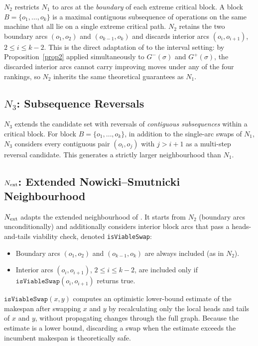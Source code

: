 \documentclass[preprint,12pt]{elsarticle}
\begin{document}
$N_2$ restricts $N_1$ to arcs at the \emph{boundary} of each extreme critical block. A block $B = \{o_1,\ldots,o_k\}$ is a maximal contiguous subsequence of operations on the same machine that all lie on a single extreme critical path. $N_2$ retains the two boundary arcs $(o_1,o_2)$ and $(o_{k-1},o_k)$ and discards interior arcs $(o_i,o_{i+1})$, $2 \leq i \leq k-2$. This is the direct adaptation of \cite{Nowicki1996} to the interval setting: by Proposition~\ref{prop2} applied simultaneously to $G^-(\sigma)$ and $G^+(\sigma)$, the discarded interior arcs cannot carry improving moves under any of the four rankings, so $N_2$ inherits the same theoretical guarantees as $N_1$.

\subsection{$N_3$: Subsequence Reversals}
\label{sec5.3}

$N_3$ extends the candidate set with reversals of \emph{contiguous subsequences} within a critical block. For block $B = \{o_1,\ldots,o_k\}$, in addition to the single-arc swaps of $N_1$, $N_3$ considers every contiguous pair $(o_i, o_j)$ with $j > i+1$ as a multi-step reversal candidate. This generates a strictly larger neighbourhood than $N_1$.

\subsection{$N_{\rm ext}$: Extended Nowicki--Smutnicki Neighbourhood}
\label{sec5.4}

$N_{\rm ext}$ adapts the extended neighbourhood of \cite{Nowicki2005}. It starts from $N_2$ (boundary arcs unconditionally) and additionally considers interior block arcs that pass a heads-and-tails viability check, denoted \texttt{isViableSwap}:
\begin{itemize}
\item Boundary arcs $(o_1,o_2)$ and $(o_{k-1},o_k)$ are always included (as in $N_2$).
\item Interior arcs $(o_i, o_{i+1})$, $2 \leq i \leq k-2$, are included only if $\texttt{isViableSwap}(o_i, o_{i+1})$ returns true.
\end{itemize}
$\texttt{isViableSwap}(x,y)$ computes an optimistic lower-bound estimate of the makespan after swapping $x$ and $y$ by recalculating only the local heads and tails of $x$ and $y$, without propagating changes through the full graph. Because the estimate is a lower bound, discarding a swap when the estimate exceeds the incumbent makespan is theoretically safe.
\end{document}
